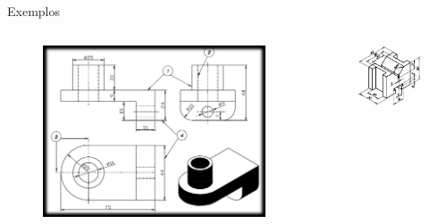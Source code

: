\documentclass{cubeamer}
\begin{document}
\begin{frame}{Exemplos}

    \begin{columns}
        \begin{column}{0.5\textwidth}
            \begin{figure}
                \centering
                \includegraphics[height = 0.6\textheight]{img/desenho2.jpg}
                \caption{\cite{listade:online}}
            \end{figure}
        \end{column}

        \begin{column}{0.5\textwidth}
            \begin{figure}
                \centering
                \includegraphics[height = 0.7\textheight]{img/desenho3.jpg}
                \caption{\cite{listade:online}}
            \end{figure}
        \end{column}
    \end{columns}
    
\end{frame}
\end{document}
